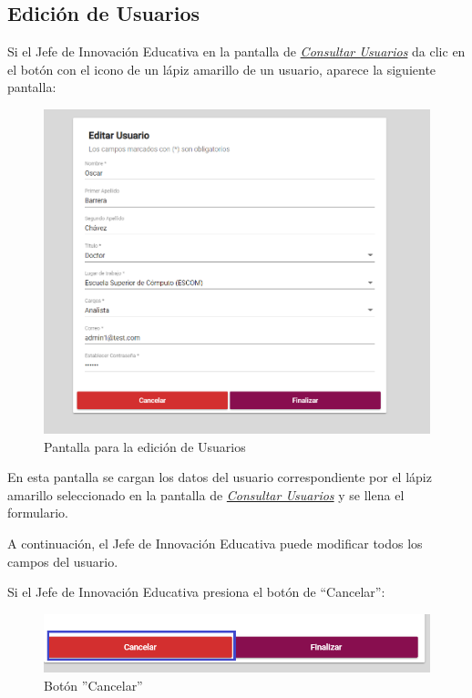\newpage

\hypertarget{editar-user-JIE}{}
\subsection{Edición de Usuarios}
Si el Jefe de Innovación Educativa en la pantalla de \hyperlink{consultarUs-JIE}{\textit{Consultar Usuarios}} da clic en el botón con el icono de un lápiz amarillo de un usuario, aparece la siguiente pantalla:

\begin{figure}[H]
	\centering
	\hypertarget{editarUs-JIE}{\includegraphics[width=0.6\linewidth]{images/SP5/Editar-Usuario}}
	\caption{Pantalla para la edición de Usuarios}
	\label{editarrh}
\end{figure}

En esta pantalla se cargan los datos del usuario correspondiente por el lápiz amarillo seleccionado en la pantalla de \hyperlink{consultarUs-JIE}{\textit{Consultar Usuarios}} y se llena el formulario.

A continuación, el Jefe de Innovación Educativa puede modificar todos los campos del usuario.

Si el Jefe de Innovación Educativa presiona el botón de “Cancelar”:

\begin{figure}[H]
	\centering
	\hypertarget{cancel2-JIE}{\includegraphics[width=0.7\linewidth]{images/SP5/BtnCancelar2}}
	\caption{Botón ''Cancelar''}
	\label{cancel2-JIE}
\end{figure}


